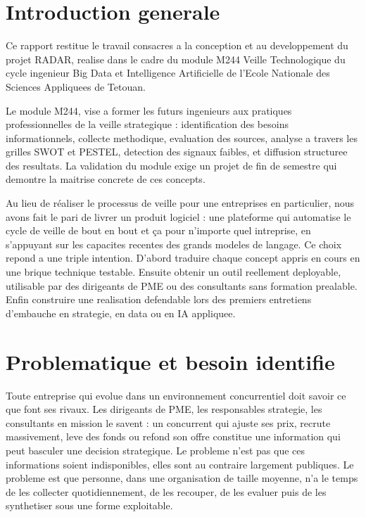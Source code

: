 \documentclass[12pt,a4paper,openany]{report}
\begin{document}
\section{Introduction generale}
\label{sec:introduction-generale}

Ce rapport restitue le  travail consacres a la conception et au developpement du projet RADAR, realise dans le cadre du module M244 Veille Technologique du cycle ingenieur Big Data et Intelligence Artificielle de l'Ecole Nationale des Sciences Appliquees de Tetouan.

Le module M244, vise a former les futurs ingenieurs aux pratiques professionnelles de la veille strategique : identification des besoins informationnels, collecte methodique, evaluation des sources, analyse a travers les grilles SWOT et PESTEL, detection des signaux faibles, et diffusion structuree des resultats. La validation du module exige un projet de fin de semestre qui demontre la maitrise concrete de ces concepts.

Au lieu de réaliser le processus de veille pour une entreprises en particulier, nous avons fait le pari de livrer un produit logiciel : une plateforme qui automatise le cycle de veille de bout en bout et ça pour n'importe quel intreprise, en s'appuyant sur les capacites recentes des grands modeles de langage. Ce choix repond a une triple intention. D'abord traduire chaque concept appris en cours en une brique technique testable. Ensuite obtenir un outil reellement deployable, utilisable par des dirigeants de PME ou des consultants sans formation prealable. Enfin construire une realisation defendable lors des premiers entretiens d'embauche en strategie, en data ou en IA appliquee.


\section{Problematique et besoin identifie}
\label{sec:problematique}

Toute entreprise qui evolue dans un environnement concurrentiel doit savoir ce que font ses rivaux. Les dirigeants de PME, les responsables strategie, les consultants en mission le savent : un concurrent qui ajuste ses prix, recrute massivement, leve des fonds ou refond son offre constitue une information qui peut basculer une decision strategique. Le probleme n'est pas que ces informations soient indisponibles, elles sont au contraire largement publiques. Le probleme est que personne, dans une organisation de taille moyenne, n'a le temps de les collecter quotidiennement, de les recouper, de les evaluer puis de les synthetiser sous une forme exploitable.
\end{document}
